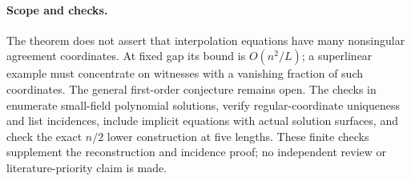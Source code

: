 \paragraph{Scope and checks.}
The theorem does not assert that interpolation equations have many
nonsingular agreement coordinates. At fixed gap its bound is
$O(n^2/L)$; a superlinear example must concentrate on witnesses with
a vanishing fraction of such coordinates. The general first-order
conjecture remains open. The checks in
 enumerate small-field
polynomial solutions, verify regular-coordinate uniqueness and list
incidences, include implicit equations with actual solution surfaces,
and check the exact $n/2$ lower construction at five lengths. These
finite checks supplement the reconstruction and incidence proof;
no independent review or literature-priority claim is made.
